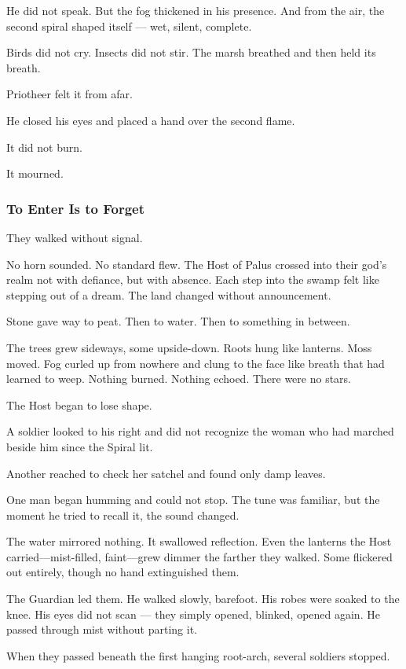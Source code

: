 \documentclass[12pt]{article}
\begin{document}
He did not speak. But the fog thickened in his presence. And from the air, the second spiral shaped itself — wet, silent, complete.

Birds did not cry. Insects did not stir. The marsh breathed and then held its breath.

Priotheer felt it from afar.

He closed his eyes and placed a hand over the second flame.

It did not burn.

It mourned.

\dotfill

\subsubsection*{To Enter Is to Forget}

They walked without signal.

No horn sounded. No standard flew. The Host of Palus crossed into their god’s realm not with defiance, but with absence. Each step into the swamp felt like stepping out of a dream. The land changed without announcement.

Stone gave way to peat. Then to water. Then to something in between.

The trees grew sideways, some upside-down. Roots hung like lanterns. Moss moved. Fog curled up from nowhere and clung to the face like breath that had learned to weep. Nothing burned. Nothing echoed. There were no stars.

The Host began to lose shape.

A soldier looked to his right and did not recognize the woman who had marched beside him since the Spiral lit.

Another reached to check her satchel and found only damp leaves.

One man began humming and could not stop. The tune was familiar, but the moment he tried to recall it, the sound changed.

The water mirrored nothing. It swallowed reflection. Even the lanterns the Host carried—mist-filled, faint—grew dimmer the farther they walked. Some flickered out entirely, though no hand extinguished them.

The Guardian led them. He walked slowly, barefoot. His robes were soaked to the knee. His eyes did not scan — they simply opened, blinked, opened again. He passed through mist without parting it.

When they passed beneath the first hanging root-arch, several soldiers stopped.
\end{document}
